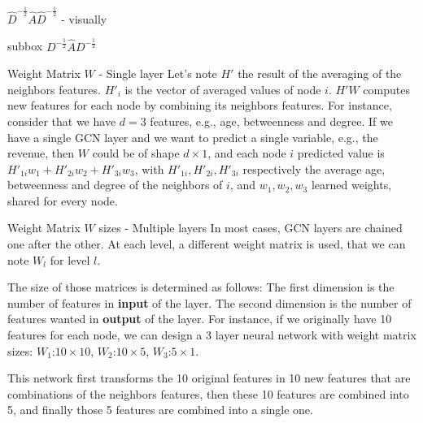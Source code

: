 \documentclass[a4paper,11pt]{book}
\begin{document}
\begin{textbox}{ $\hat{D}^{-\frac{1}{2}}\hat{A}\hat{D}^{-\frac{1}{2}}$ - visually}
\begin{multibox}{2}
\begin{subbox}{subbox}{}
$D^{-\frac{1}{2}}\hat{A}D^{-\frac{1}{2}}$
\end{subbox}

\end{multibox}

\end{textbox}








\begin{textbox}{Weight Matrix $W$ - Single layer}
Let's note $H'$ the result of the averaging of the neighbors features. $H'_i$ is the vector of averaged values of node $i$. $H'W$ computes new features for each node by combining its neighbors features. For instance, consider that we have $d=3$ features, e.g., age, betweenness and degree. If we have a single GCN layer and we want to predict a single variable, e.g., the revenue, then $W$ could be of shape $d\times 1$, and each node $i$ predicted value is $H'_{1i}w_1+H'_{2i}w_2+H'_{3i}w_3$, with $H'_{1i},H'_{2i},H'_{3i}$ respectively the average age, betweenness and degree of the neighbors of $i$, and $w_1,w_2,w_3$ learned weights, shared for every node.
\end{textbox}



\begin{textbox}{Weight Matrix $W$ sizes - Multiple layers}
In most cases, GCN layers are chained one after the other. At each level, a different weight matrix is used, that we can note $W_l$ for level $l$.

The size of those matrices is determined as follows: The first dimension is the number of features in \textbf{input} of the layer. The second dimension is the number of features wanted in \textbf{output} of the layer. For instance, if we originally have 10 features for each node, we can design a 3 layer neural network with weight matrix sizes: $W_1$:$10\times 10$, $W_2$:$10\times 5$, $W_3$:$5\times 1$. 

This network first transforms the 10 original features in 10 new features that are combinations of the neighbors features, then these 10 features are combined into 5, and finally those 5 features are combined into a single one.
\end{textbox}
\end{document}
